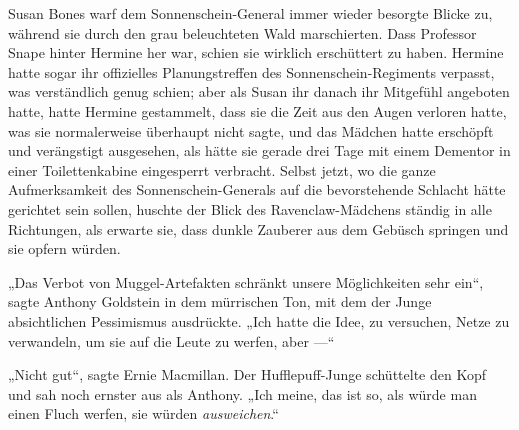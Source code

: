 Susan Bones warf dem Sonnenschein-General immer wieder besorgte Blicke zu, während sie durch den grau beleuchteten Wald marschierten. Dass Professor Snape hinter Hermine her war, schien sie wirklich erschüttert zu haben. Hermine hatte sogar ihr offizielles Planungstreffen des Sonnenschein-Regiments verpasst, was verständlich genug schien; aber als Susan ihr danach ihr Mitgefühl angeboten hatte, hatte Hermine gestammelt, dass sie die Zeit aus den Augen verloren hatte, was sie normalerweise überhaupt nicht sagte, und das Mädchen hatte erschöpft und verängstigt ausgesehen, als hätte sie gerade drei Tage mit einem Dementor in einer Toilettenkabine eingesperrt verbracht. Selbst jetzt, wo die ganze Aufmerksamkeit des Sonnenschein-Generals auf die bevorstehende Schlacht hätte gerichtet sein sollen, huschte der Blick des Ravenclaw-Mädchens ständig in alle Richtungen, als erwarte sie, dass dunkle Zauberer aus dem Gebüsch springen und sie opfern würden.

„Das Verbot von Muggel-Artefakten schränkt unsere Möglichkeiten sehr ein“, sagte Anthony Goldstein in dem mürrischen Ton, mit dem der Junge absichtlichen Pessimismus ausdrückte.
„Ich hatte die Idee, zu versuchen, Netze zu verwandeln, um sie auf die Leute zu werfen, aber —“

„Nicht gut“, sagte Ernie Macmillan. Der Hufflepuff-Junge schüttelte den Kopf und sah noch ernster aus als Anthony.
„Ich meine, das ist so, als würde man einen Fluch werfen, sie würden \emph{ausweichen}.“

